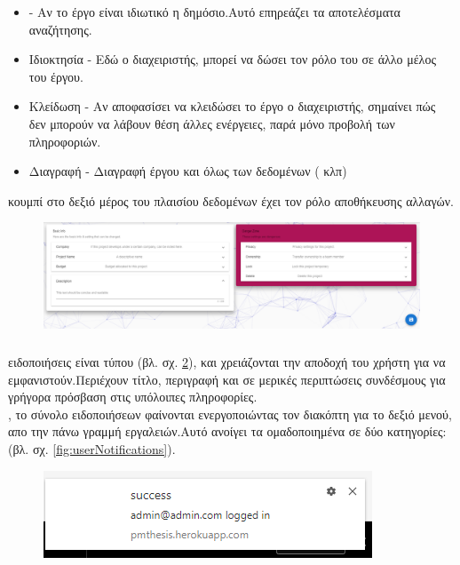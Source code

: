 \begin{itemize}
	\item {} - Αν το έργο είναι ιδιωτικό η δημόσιο.Αυτό επηρεάζει τα αποτελέσματα αναζήτησης.
	\item Ιδιοκτησία - Εδώ ο διαχειριστής, μπορεί να δώσει τον ρόλο του σε άλλο μέλος του έργου.
	\item Κλείδωση - Αν αποφασίσει να κλειδώσει το έργο ο διαχειριστής, σημαίνει πώς δεν μπορούν να λάβουν θέση άλλες ενέργειες, παρά μόνο προβολή των πληροφοριών.
	\item Διαγραφή - Διαγραφή έργου και όλως των δεδομένων ( κλπ)
\end{itemize}

 κουμπί στο δεξιό μέρος του πλαισίου δεδομένων έχει τον ρόλο αποθήκευσης αλλαγών.

\begin{figure}[!htb]
\includegraphics[width=\linewidth]{images/projectSettings.png}
\caption{}
\label{fig:projectSettings}
\end{figure}

\subsubsection*{}
 ειδοποιήσεις είναι τύπου  (βλ. σχ. \ref{fig:pushNotification}), και χρειάζονται την αποδοχή του χρήστη για να εμφανιστούν.Περιέχουν τίτλο, περιγραφή και σε μερικές περιπτώσεις συνδέσμους για γρήγορα πρόσβαση στις υπόλοιπες πληροφορίες.\\
, το σύνολο ειδοποιήσεων φαίνονται ενεργοποιώντας τον διακόπτη για το δεξιό μενού, απο την πάνω γραμμή εργαλειών.Αυτό ανοίγει τα  ομαδοποιημένα σε δύο κατηγορίες:  (βλ. σχ. \ref{fig:userNotifications}).

\begin{figure}[!htb]
\centering
\includegraphics[scale=0.5]{images/pushNotification.png}
\caption{}
\label{fig:pushNotification}
\end{figure}

